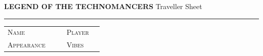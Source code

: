 \newcommand{\sheetskillblank}{%
  \rule{30mm}{0.3pt} &
  \raisebox{1pt}{\framebox[5mm]{\phantom{B}}} &
  \sheetknownbox\\[1.5pt]}

\newcommand{\sheetitemrow}{\rule{42mm}{0.3pt}\hspace{3pt}\sheetfourpips\par\vspace{4pt}}

\newcommand{\sheetsechead}[2][atrAccent]{%
  \par{\color{#1}\rule{\linewidth}{0.7pt}}\par\vspace{1pt}%
  {\hdfont\bfseries\footnotesize\color{#1}#2}\par\vspace{4pt}}

\newcommand{\sheettattoobox}[1][55mm]{%
  \par
  \begin{tikzpicture}
    \draw[color=atrAccent, line width=0.9pt, rounded corners=2pt]
      (0,0) rectangle (\linewidth, #1);
    \draw[color=atrAccent, line width=0.3pt, opacity=0.5, rounded corners=1pt]
      (2mm, 2mm) rectangle (\linewidth-2mm, #1-2mm);
    \node[anchor=south, opacity=0.18, font=\hdfont\footnotesize\color{atrAccent}]
      at (0.5\linewidth, 2.5mm) {TATTOOS};
  \end{tikzpicture}
  \par}

{}

\noindent
{\hdfont\bfseries\normalsize\color{atrAccent}LEGEND OF THE TECHNOMANCERS}
\hfill
{\hdfont\small\color{atrRule}Traveller Sheet}%
\hspace{4pt}
\par\vspace{2pt}
{\color{atrAccent}\rule{\linewidth}{1.2pt}}
\par\vspace{5pt}

\begin{tabularx}{\linewidth}{@{}lXp{4mm}lX@{}}
  {\small\textsc{Name}} &
  \underline{\hfill} & &
  {\small\textsc{Player}} &
  \underline{\hfill} \\[6pt]
  {\small\textsc{Appearance}} &
  \underline{\hfill} & &
  {\small\textsc{Vibes}} &
  \underline{\hfill} \\
\end{tabularx}

